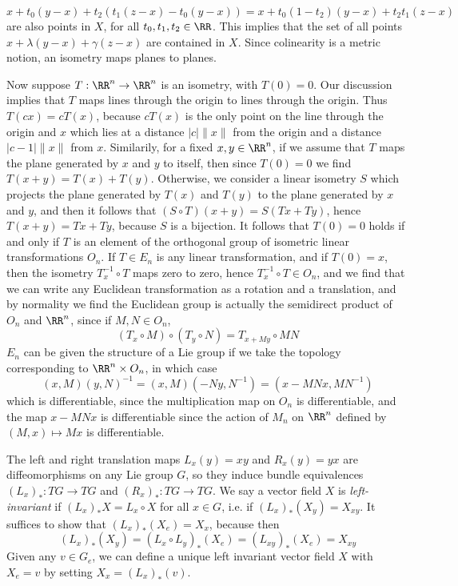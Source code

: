 %
\[ x + t_0 (y - x) + t_2 (t_1 (z - x) - t_0 (y - x)) = x + t_0 (1 - t_2) (y - x) + t_2 t_1 (z - x) \]
%
are also points in $X$, for all $t_0,t_1,t_2 \in \RR$. This implies that the set of all points $x + \lambda (y - x) + \gamma (z - x)$ are contained in $X$. Since colinearity is a metric notion, an isometry maps planes to planes.

Now suppose $T: \RR^n \to \RR^n$ is an isometry, with $T(0) = 0$. Our discussion implies that $T$ maps lines through the origin to lines through the origin. Thus $T(cx) = cT(x)$, because $cT(x)$ is the only point on the line through the origin and $x$ which lies at a distance $|c|\|x\|$ from the origin and a distance $|c - 1|\|x\|$ from $x$. Similarily, for a fixed $x,y \in \RR^n$, if we assume that $T$ maps the plane generated by $x$ and $y$ to itself, then since $T(0) = 0$ we find $T(x + y) = T(x) + T(y)$. Otherwise, we consider a linear isometry $S$ which projects the plane generated by $T(x)$ and $T(y)$ to the plane generated by $x$ and $y$, and then it follows that $(S \circ T)(x + y) = S(Tx + Ty)$, hence $T(x + y) = Tx + Ty$, because $S$ is a bijection. It follows that $T(0) = 0$ holds if and only if $T$ is an element of the orthogonal group of isometric linear transformations $O_n$. If $T \in E_n$ is any linear transformation, and if $T(0) = x$, then the isometry $T_x^{-1} \circ T$ maps zero to zero, hence $T_x^{-1} \circ T \in O_n$, and we find that we can write any Euclidean transformation as a rotation and a translation, and by normality we find the Euclidean group is actually the semidirect product of $O_n$ and $\RR^n$, since if $M,N \in O_n$,
%
\[ (T_x \circ M) \circ (T_y \circ N) = T_{x + My} \circ MN \]
%
$E_n$ can be given the structure of a Lie group if we take the topology corresponding to $\RR^n \times O_n$, in which case
%
\[ (x,M)(y,N)^{-1} = (x,M)(-Ny,N^{-1}) = (x - MNx,MN^{-1}) \]
%
which is differentiable, since the multiplication map on $O_n$ is differentiable, and the map $x - MNx$ is differentiable since the action of $M_n$ on $\RR^n$ defined by $(M,x) \mapsto Mx$ is differentiable.

The left and right translation maps $L_x(y) = xy$ and $R_x(y) = yx$ are diffeomorphisms on any Lie group $G$, so they induce bundle equivalences $(L_x)_*: TG \to TG$ and $(R_x)_*: TG \to TG$. We say a vector field $X$ is \emph{left-invariant} if $(L_x)_* X = L_x \circ X$ for all $x \in G$, i.e. if $(L_x)_*(X_y) = X_{xy}$. It suffices to show that $(L_x)_*(X_e) = X_x$, because then
%
\[ (L_x)_*(X_y) = (L_x \circ L_y)_*(X_e) = (L_{xy})_*(X_e) = X_{xy} \]
%
Given any $v \in G_e$, we can define a unique left invariant vector field $X$ with $X_e = v$ by setting $X_x = (L_x)_*(v)$.

